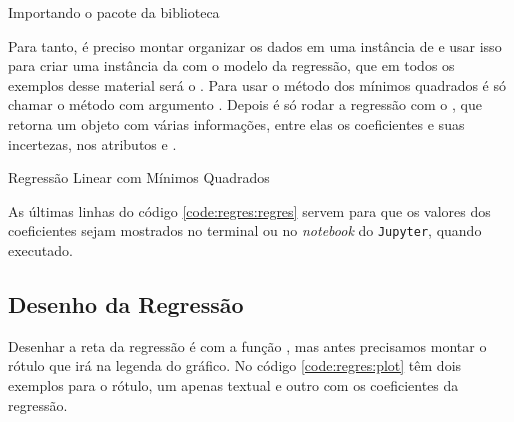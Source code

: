     \begin{listing}[H]
        \caption{Importando o pacote  da biblioteca \scipy}
        \label{code:regres:odr}

    \end{listing}

    Para tanto, é preciso montar organizar os dados em uma instância de  e usar isso para criar uma instância da  com o modelo da regressão, que em todos os exemplos desse material será o . Para usar o método dos mínimos quadrados é só chamar o método  com argumento . Depois é só rodar a regressão com o , que retorna um objeto  com várias informações, entre elas os coeficientes e suas incertezas, nos atributos  e .

    \begin{listing}[H]
        \caption{Regressão Linear com Mínimos Quadrados}
        \label{code:regres:regres}

    \end{listing}

    As últimas linhas do código \ref{code:regres:regres} servem para que os valores dos coeficientes sejam mostrados no terminal ou no \textit{notebook} do \texttt{Jupyter}, quando executado.


\subsection{Desenho da Regressão}

    Desenhar a reta da regressão é com a função , mas antes precisamos montar o rótulo que irá na legenda do gráfico. No código \ref{code:regres:plot} têm dois exemplos para o rótulo, um apenas textual e outro com os coeficientes da regressão.


